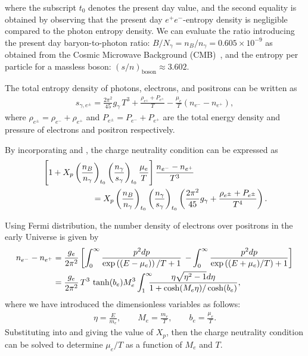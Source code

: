 where the subscript $t_0$ denotes the present day value, and the second equality is obtained by observing that the present day $e^+e^-$-entropy density is negligible compared to the photon entropy density. We can evaluate the ratio introducing the present day baryon-to-photon ratio: $B/N_\gamma =n_B/n_\gamma= 0.605\times10^{-9}$ as obtained from the Cosmic Microwave Background (CMB)~\cite{ParticleDataGroup:2022pth}, and the entropy per particle for a massless boson: $(s/n)_{\mathrm{boson}}\approx 3.602$.

The total entropy density of photons, electrons, and positrons can be written as
\begin{align}\label{entropy_per_baryon}
s_{\gamma,e^\pm}=\frac{2\pi^2}{45}g_\gamma\,T^3+\frac{\rho_{e^\pm}+P_{e^\pm}}{T}-\frac{\mu_e}{T}(n_{e^-}-n_{{e^+}}),
 \end{align}
where $ \rho_{e^\pm}=\rho_{e^-}+\rho_{e^+}$ and $P_{e^\pm}=P_{e^-}+P_{{e^+}}$ are the total energy density and pressure of electrons and positron respectively.

By incorporating  and , the charge neutrality condition can be expressed as
\begin{align}\label{charge_neutral_cond3}
 &\left[1+X_p\left(\frac{n_B}{n_\gamma}\right)_{t_0}\left(\frac{n_\gamma}{s_{\gamma}}\right)_{t_0}\frac{\mu_e}{T}\right]\frac{n_{e^-}-n_{{e^+}}}{T^3}\notag\\
 &\qquad\qquad\qquad=X_p\left(\frac{n_B}{n_\gamma}\right)_{t_0}\left(\frac{n_\gamma}{s_{\gamma}}\right)_{t_0} \left(\frac{2\pi^2}{45}g_\gamma+\frac{\rho_{e^\pm}+P_{e^\pm}}{T^4}\right).
\end{align}

Using Fermi distribution, the number density of electrons over positrons in the early Universe is given by
\begin{align}\label{ee_density}
n_{e^-}-n_{{e^+}}&=\frac{g_e}{2\pi^2}\left[\int_0^\infty\frac{p^2dp}{\exp{\left((E-\mu_e)\right)/T}+1}\right.\left.-\int_0^\infty\frac{p^2dp}{\exp{\left((E+\mu_e)/T\right)}+1}\right]\notag\\
&=\frac{g_e}{2\pi^2}\,{T^3}\,\tanh(b_e)M_e^3\int_{1}^\infty \!\!\!\!\frac{ \eta \sqrt{\eta^2-1} d\eta}{1+\cosh(M_e\eta)/\cosh(b_e)},
\end{align}
where we have introduced the dimensionless variables as follows: 
\begin{align}\label{Variables}
\eta=\frac{E}{m_e},\qquad M_e=\frac{m_e}{T},\qquad b_e=\frac{\mu_e}{T}.
\end{align}
Substituting  into  and giving the value of $X_p$, then the charge neutrality condition can be solved to determine $\mu_e/T$ as a function of $M_e$ and $T$. 

